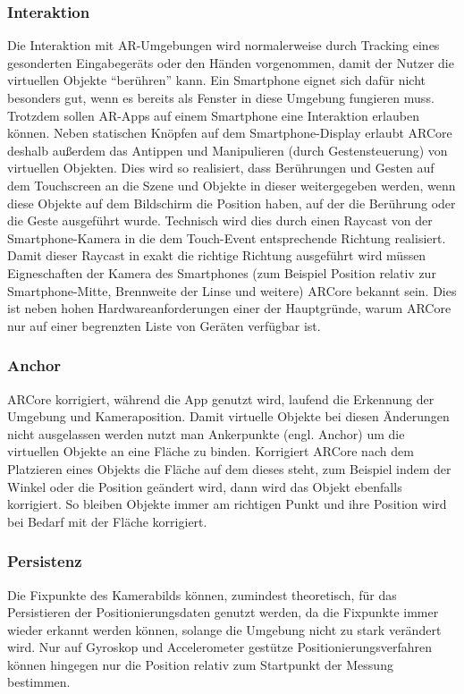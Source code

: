 \documentclass[10pt]{scrartcl}
\begin{document}
\subsubsection{Interaktion}
Die Interaktion mit AR-Umgebungen wird normalerweise durch Tracking eines gesonderten Eingabegeräts oder den Händen vorgenommen, damit der Nutzer die virtuellen Objekte \enquote{berühren} kann. Ein Smartphone eignet sich dafür nicht besonders gut, wenn es bereits als Fenster in diese Umgebung fungieren muss. Trotzdem sollen AR-Apps auf einem Smartphone eine Interaktion erlauben können. Neben statischen Knöpfen auf dem Smartphone-Display erlaubt ARCore deshalb außerdem das Antippen und Manipulieren (durch Gestensteuerung) von virtuellen Objekten. Dies wird so realisiert, dass Berührungen und Gesten auf dem Touchscreen an die Szene und Objekte in dieser weitergegeben werden, wenn diese Objekte auf dem Bildschirm die Position haben, auf der die Berührung oder die Geste ausgeführt wurde. Technisch wird dies durch einen Raycast von der Smartphone-Kamera in die dem Touch-Event entsprechende Richtung realisiert. Damit dieser Raycast in exakt die richtige Richtung ausgeführt wird müssen Eigneschaften der Kamera des Smartphones (zum Beispiel Position relativ zur Smartphone-Mitte, Brennweite der Linse und weitere) ARCore bekannt sein. Dies ist neben hohen Hardwareanforderungen einer der Hauptgründe, warum ARCore nur auf einer begrenzten Liste von Geräten verfügbar ist.

\subsubsection{Anchor}
ARCore korrigiert, während die App genutzt wird, laufend die Erkennung der Umgebung und Kameraposition. Damit virtuelle Objekte bei diesen Änderungen nicht ausgelassen werden nutzt man Ankerpunkte (engl. Anchor) um die virtuellen Objekte an eine Fläche zu binden. Korrigiert ARCore nach dem Platzieren eines Objekts die Fläche auf dem dieses steht, zum Beispiel indem der Winkel oder die Position geändert wird, dann wird das Objekt ebenfalls korrigiert. So bleiben Objekte immer am richtigen Punkt und ihre Position wird bei Bedarf mit der Fläche korrigiert.

\subsubsection{Persistenz}
Die Fixpunkte des Kamerabilds können, zumindest theoretisch, für das Persistieren der Positionierungsdaten genutzt werden, da die Fixpunkte immer wieder erkannt werden können, solange die Umgebung nicht zu stark verändert wird. Nur auf Gyroskop und Accelerometer gestütze Positionierungsverfahren können hingegen nur die Position relativ zum Startpunkt der Messung bestimmen.
\end{document}
